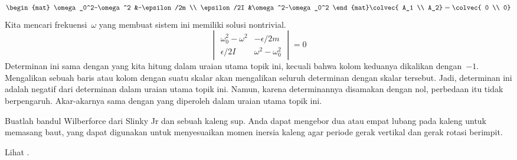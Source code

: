 \begin{exercises}
\begin{answer}
\begin{equation*}
\begin{mat}
       \omega_0^2-\omega^2    &-\epsilon/2m  \\
       \epsilon/2I &\omega^2-\omega_0^2 
     \end{mat}
     \colvec{
       A_1 \\
       A_2}
     =
     \colvec{
       0 \\
       0}
   \end{equation*}
   Kita mencari frekuensi~$\omega$ yang membuat sistem ini memiliki
   solusi nontrivial. 
   \begin{equation*}
      \begin{vmatrix}
       \omega_0^2-\omega^2    &-\epsilon/2m  \\
       \epsilon/2I           &\omega^2-\omega_0^2 
      \end{vmatrix}
      =0
    \end{equation*}
    Determinan ini sama dengan yang kita hitung dalam uraian utama topik ini,
    kecuali bahwa kolom keduanya dikalikan dengan~$-1$.
    Mengalikan sebuah baris atau kolom dengan suatu skalar akan mengalikan seluruh determinan
    dengan skalar tersebut.
    Jadi, determinan ini adalah negatif dari determinan dalam uraian utama topik ini.
    Namun, karena determinannya disamakan dengan nol, perbedaan itu tidak berpengaruh.
    Akar-akarnya sama dengan yang diperoleh dalam uraian utama topik ini. 
  \end{answer}
\item Buatlah bandul Wilberforce dari Slinky Jr dan sebuah kaleng sup.
  Anda dapat mengebor dua atau empat lubang pada kaleng untuk memasang baut,
  yang dapat digunakan untuk menyesuaikan
  momen inersia kaleng agar periode gerak vertikal dan 
  gerak rotasi berimpit.
  \begin{answer}
    Lihat \cite{Mewes}.
  \end{answer}
\end{exercises}
\endinput
% 
